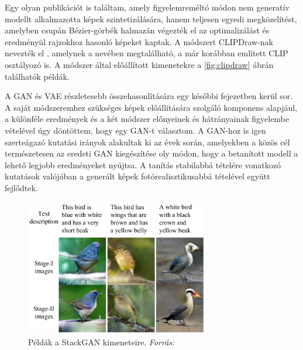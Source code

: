 Egy olyan publikációt is találtam, amely figyelemreméltó módon nem generatív modellt alkalmazotta képek szintetizálására, hanem teljesen egyedi megközelítést, amelyben csupán Bézier-görbék halmazán végezték el az optimalizálást és eredményül rajzokhoz hasonló képeket kaptak. A módszert CLIPDraw-nak nevezték el \cite{frans2021clipdraw}, amelynek a nevében megtalálható, a már korábban említett CLIP osztályozó is. A módszer által előállított kimenetekre a \ref{fig:clipdraw} ábrán találhatók példák.

A GAN és VAE részletesebb összehasonlítására egy későbbi fejezetben kerül sor. A saját módszeremhez szükséges képek előállítására szolgáló komponens alapjául, a különféle eredmények és a két módszer előnyeinek és hátrányainak figyelembe vételével úgy döntöttem, hogy egy GAN-t választom.
A GAN-hoz is igen szerteágazó kutatási irányok alakultak ki az évek során, amelyekben a közös cél természetesen az eredeti GAN kiegészítése oly módon, hogy a betanított modell a lehető legjobb eredményeket nyújtsa. A tanítás stabilabbá tételére vonatkozó kutatások valójában a generált képek fotórealisztikusabbá tételével együtt fejlődtek.

\begin{figure}[h]
	\centering
	\includegraphics[width=8cm]{images/stackGAN.png}
	\caption{Példák a StackGAN kimeneteire. \textit{Forrás: \cite{zhang2017stackgan}} }
	\label{fig:stackgan}
\end{figure}

